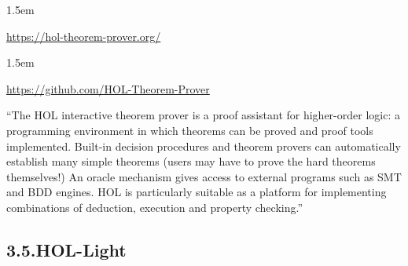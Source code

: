 \documentclass[12pt,twoside]{article}
\begin{document}
\begin{mddefinitions}%


\begin{mdbmarginx}{}{}{}{1.5em}%
\begin{mddefdata}%
\href{https://hol-theorem-prover.org/}{{\ttfamily https://\hspace{0pt}hol-\hspace{0pt}theorem-\hspace{0pt}prover.\hspace{0pt}org/\hspace{0pt}}}
\end{mddefdata}%
\end{mdbmarginx}%


\begin{mdbmarginx}{}{}{}{1.5em}%
\begin{mddefdata}%
\href{https://github.com/HOL-Theorem-Prover}{{\ttfamily https://\hspace{0pt}github.\hspace{0pt}com/\hspace{0pt}HOL-\hspace{0pt}Theorem-\hspace{0pt}Prover}}%
\end{mddefdata}%
\end{mdbmarginx}%
\end{mddefinitions}%

\noindent{}\textquotedblleft{}The HOL interactive theorem prover is a proof assistant for
higher-order logic: a programming environment in which theorems can be
proved and proof tools implemented. Built-in decision procedures and
theorem provers can automatically establish many simple theorems
(users may have to prove the hard theorems themselves!) An oracle
mechanism gives access to external programs such as SMT and BDD
engines. HOL is particularly suitable as a platform for implementing
combinations of deduction, execution and property checking.\textquotedblright{}%

\subsection{3.5.\hspace*{0.5em}HOL-Light}%
\end{document}

